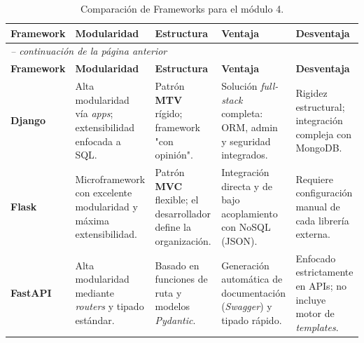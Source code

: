 \begingroup
\setlength{\tabcolsep}{3pt} 
\renewcommand{\arraystretch}{1.3} %
\footnotesize %

\begin{longtable}{|p{1.9cm}|>{\RaggedRight}p{2.8cm}|>{\RaggedRight}p{2.8cm}|>{\RaggedRight}p{3.2cm}|>{\RaggedRight}p{3.2cm}|}
    \caption{Comparación de Frameworks para el módulo 4.} \label{tab:frameworks} \\
    \hline
    \textbf{Framework} & \textbf{Modularidad} & \textbf{Estructura} & \textbf{Ventaja} & \textbf{Desventaja} \\ \hline
    \endfirsthead
    
    \multicolumn{5}{l}{\footnotesize\itshape -- continuación de la página anterior} \\ \hline
    \textbf{Framework} & \textbf{Modularidad} & \textbf{Estructura} & \textbf{Ventaja} & \textbf{Desventaja} \\ \hline
    \endhead

    \textbf{Django} \cite{zotero-item-140} & Alta modularidad vía \textit{apps}; extensibilidad enfocada a SQL. & Patrón \textbf{MTV} rígido; framework "con opinión". & Solución \textit{full-stack} completa: ORM, admin y seguridad integrados. & Rigidez estructural; integración compleja con MongoDB. \\ \hline
    
    \textbf{Flask} \cite{zotero-item-142} & Microframework con excelente modularidad y máxima extensibilidad. & Patrón \textbf{MVC} flexible; el desarrollador define la organización. & Integración directa y de bajo acoplamiento con NoSQL (JSON). & Requiere configuración manual de cada librería externa. \\ \hline
    
    \textbf{FastAPI} \cite{zotero-item-144} & Alta modularidad mediante \textit{routers} y tipado estándar. & Basado en funciones de ruta y modelos \textit{Pydantic}. & Generación automática de documentación (\textit{Swagger}) y tipado rápido. & Enfocado estrictamente en APIs; no incluye motor de \textit{templates}. \\ \hline
\end{longtable}
\endgroup
